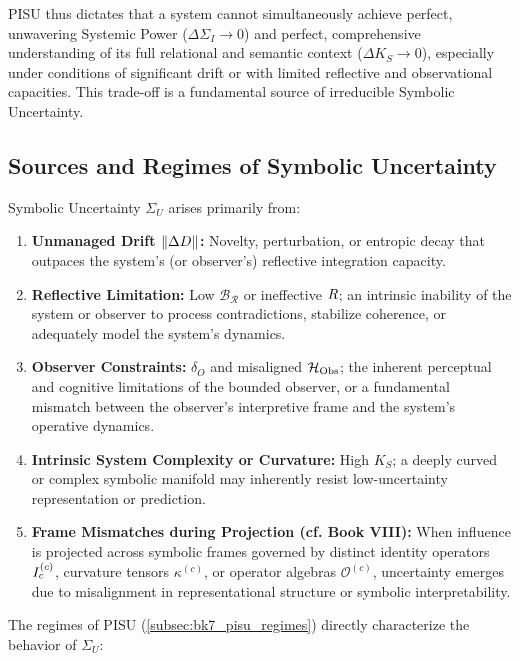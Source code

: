 PISU thus dictates that a system cannot simultaneously achieve perfect, unwavering Systemic Power (\(\Delta\Sigma_I \to 0\)) and perfect, comprehensive understanding of its full relational and semantic context (\(\Delta K_S \to 0\)), especially under conditions of significant drift or with limited reflective and observational capacities. This trade-off is a fundamental source of irreducible Symbolic Uncertainty.

\subsection{Sources and Regimes of Symbolic Uncertainty}
\label{subsec:bk7_sources_regimes_uncertainty}
Symbolic Uncertainty \(\Sigma_U\) arises primarily from:
\begin{enumerate}
    \item \textbf{Unmanaged Drift \(\|\Delta D\|\):} Novelty, perturbation, or entropic decay that outpaces the system’s (or observer’s) reflective integration capacity.
    \item \textbf{Reflective Limitation:} Low \(\mathcal{B_R}\) or ineffective \(R\); an intrinsic inability of the system or observer to process contradictions, stabilize coherence, or adequately model the system’s dynamics.
    \item \textbf{Observer Constraints:} \(\delta_O\) and misaligned \(\mathcal{H}_{\mathrm{Obs}}\); the inherent perceptual and cognitive limitations of the bounded observer, or a fundamental mismatch between the observer’s interpretive frame and the system’s operative dynamics.
    \item \textbf{Intrinsic System Complexity or Curvature:} High \(K_S\); a deeply curved or complex symbolic manifold may inherently resist low-uncertainty representation or prediction.
    \item \textbf{Frame Mismatches during Projection (cf. Book VIII):} When influence is projected across symbolic frames governed by distinct identity operators \(I_c^{(c)}\), curvature tensors \(\kappa^{(c)}\), or operator algebras \(\mathcal{O}^{(c)}\), uncertainty emerges due to misalignment in representational structure or symbolic interpretability.
\end{enumerate}
The regimes of PISU (\ref{subsec:bk7_pisu_regimes}) directly characterize the behavior of \(\Sigma_U\):
